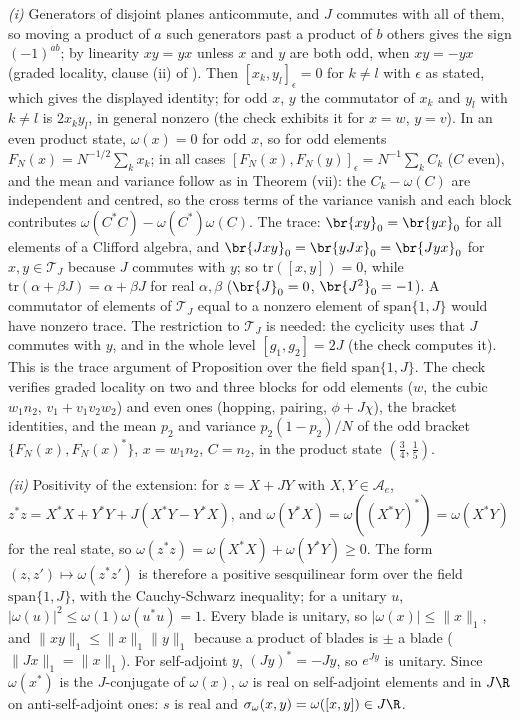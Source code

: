 \emph{(i)} Generators of disjoint planes anticommute, and $J$ commutes with all of them, so moving a product of $a$ such generators past a product of $b$ others gives the sign $(-1)^{ab}$; by linearity $xy = yx$ unless $x$ and $y$ are both odd, when $xy = -yx$ (graded locality, clause (ii) of ). Then $[x_{k}, y_{l}]_{\epsilon} = 0$ for $k \ne l$ with $\epsilon$ as stated, which gives the displayed identity; for odd $x$, $y$ the commutator of $x_{k}$ and $y_{l}$ with $k \ne l$ is $2x_{k}y_{l}$, in general nonzero (the check exhibits it for $x = w$, $y = v$). In an even product state, $\omega(x) = 0$ for odd $x$, so for odd elements $F_{N}(x) = N^{-1/2}\sum_{k}x_{k}$; in all cases $[F_{N}(x), F_{N}(y)]_{\epsilon} = N^{-1}\sum_{k}C_{k}$ ($C$ even), and the mean and variance follow as in Theorem (vii): the $C_{k} - \omega(C)$ are independent and centred, so the cross terms of the variance vanish and each block contributes $\omega(C^{*}C) - \omega(C^{*})\omega(C)$. The trace: $\br{xy}_{0} = \br{yx}_{0}$ for all elements of a Clifford algebra, and $\br{Jxy}_{0} = \br{yJx}_{0} = \br{Jyx}_{0}$ for $x, y \in \mathcal{T}_{J}$ because $J$ commutes with $y$; so $\mathrm{tr}([x, y]) = 0$, while $\mathrm{tr}(\alpha + \beta J) = \alpha + \beta J$ for real $\alpha, \beta$ ($\br{J}_{0} = 0$, $\br{J^{2}}_{0} = -1$). A commutator of elements of $\mathcal{T}_{J}$ equal to a nonzero element of $\mathrm{span}\{1, J\}$ would have nonzero trace. The restriction to $\mathcal{T}_{J}$ is needed: the cyclicity uses that $J$ commutes with $y$, and in the whole level $[g_{1}, g_{2}] = 2J$ (the check computes it). This is the trace argument of Proposition  over the field $\mathrm{span}\{1, J\}$. The check verifies graded locality on two and three blocks for odd elements ($w$, the cubic $w_{1}n_{2}$, $v_{1} + v_{1}v_{2}w_{2}$) and even ones (hopping, pairing, $\phi + J\chi$), the bracket identities, and the mean $p_{2}$ and variance $p_{2}(1 - p_{2})/N$ of the odd bracket $\{F_{N}(x), F_{N}(x)^{*}\}$, $x = w_{1}n_{2}$, $C = n_{2}$, in the product state $(\tfrac34, \tfrac15)$.

\emph{(ii)} Positivity of the extension: for $z = X + JY$ with $X, Y \in \mathcal{A}_{e}$, $z^{*}z = X^{*}X + Y^{*}Y + J(X^{*}Y - Y^{*}X)$, and $\omega(Y^{*}X) = \omega((X^{*}Y)^{*}) = \omega(X^{*}Y)$ for the real state, so $\omega(z^{*}z) = \omega(X^{*}X) + \omega(Y^{*}Y) \ge 0$. The form $(z, z') \mapsto \omega(z^{*}z')$ is therefore a positive sesquilinear form over the field $\mathrm{span}\{1, J\}$, with the Cauchy-Schwarz inequality; for a unitary $u$, $|\omega(u)|^{2} \le \omega(1)\omega(u^{*}u) = 1$. Every blade is unitary, so $|\omega(x)| \le \|x\|_{1}$, and $\|xy\|_{1} \le \|x\|_{1}\|y\|_{1}$ because a product of blades is $\pm$ a blade ($\|Jx\|_{1} = \|x\|_{1}$). For self-adjoint $y$, $(Jy)^{*} = -Jy$, so $e^{Jy}$ is unitary. Since $\omega(x^{*})$ is the $J$-conjugate of $\omega(x)$, $\omega$ is real on self-adjoint elements and in $J\R$ on anti-self-adjoint ones: $s$ is real and $\sigma_{\omega}(x, y) = \omega([x, y]) \in J\R$.

